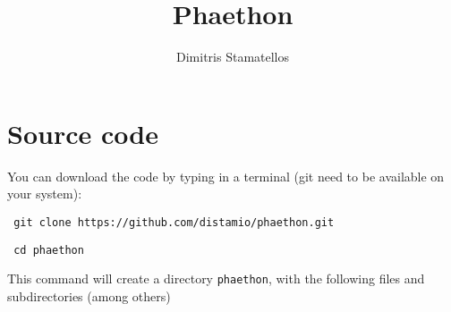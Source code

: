\documentclass[12pt,a4paper]{article}
\begin{document}
\title{{\sc Phaethon}\\ \vspace{0.5cm}  \large{}}

\author{Dimitris Stamatellos}

\maketitle

\small
\pagebreak


\section{Source code}

You can download the code by typing in a terminal (git need to be available on your system):
\vspace{0.5cm}

 \texttt{ git clone https://github.com/distamio/phaethon.git}
 
  \texttt{ cd phaethon}
\vspace{0.5cm}


This command will create a directory \texttt{phaethon}, with  the following files and subdirectories (among others)
\end{document}
